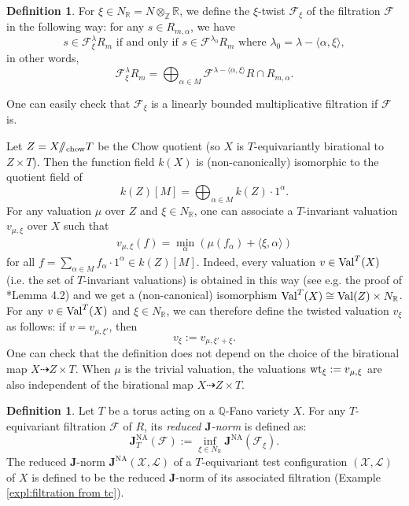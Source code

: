 \documentclass[12pt,reqno]{amsart}%
\newcommand{\bR}{{\mathbb{R} }}
\newcommand{\bZ}{{\mathbb{Z} }}
\newcommand{\cX}{{\mathcal{X}}}
\newcommand{\cL}{{\mathcal{L}}}
\newcommand{\cF}{\mathcal{F}}
\newcommand{\JNA}{\mathbf{J}^{\mathrm{NA}}}
\newcommand{\bfJ}{\mathbf{J} }
\theoremstyle{definition}
\newtheorem{defn}[thm]{Definition}
\theoremstyle{remark}
\newcommand{\Val}{{\rm Val}}
\newcommand{\ra}{{\rangle}}
\newcommand{\wt}{{\rm wt}}
\begin{document}
\begin{defn}\label{d-quotient}
For $\xi\in N_{\bR}=N\otimes_\bZ \bR$, we define the $\xi$-twist $\cF_{\xi}$ of the filtration $\cF$ in the following way: for any $s\in  R_{m,\alpha}$, we have
$$s\in \cF^\lambda_{\xi} R_m \mbox{ if and only if } s\in \cF^{\lambda_0} R_m \mbox{ where }\lambda_0=\lambda-\langle\alpha, \xi \ra,$$
in other words, 
 $$\cF^\lambda_{\xi} R_m = \bigoplus_{\alpha\in M}  \cF^{\lambda-\langle\alpha, \xi \ra}{R}\cap R_{m,\alpha}.$$
\end{defn}

One can easily check that $\cF_{\xi}$ is a linearly bounded multiplicative filtration if $\cF$ is. 

Let $Z=X  /\!\!/_{\rm chow}T$ be the Chow quotient (so $X$ is $T$-equivariantly birational to $Z\times T$). Then the function field $k(X)$ is (non-canonically) isomorphic to the quotient field of $$k(Z)[M]=\bigoplus_{\alpha\in M} k(Z)\cdot 1^\alpha.$$
For any valuation $\mu$ over $Z$ and $\xi\in N_\bR$, one can associate a $T$-invariant valuation $v_{\mu,\xi}$ over $X$ such that
\begin{eqnarray}\label{e-valuation}
v_{\mu,\xi}(f)=\min_{\alpha}(\mu(f_{\alpha})+\langle \xi, {\alpha}\ra)
\end{eqnarray}
for all $f=\sum_{\alpha\in M} f_{\alpha}\cdot 1^\alpha \in k(Z)[M]$. Indeed, every valuation $v\in \Val^T(X)$ (i.e. the set of $T$-invariant valuations) is obtained in this way (see e.g. the proof of \cite{BHJ17}*{Lemma 4.2}) and we get a (non-canonical) isomorphism $\Val^T(X)\cong \Val(Z)\times N_\bR$. For any $v\in\Val^T(X)$ and $\xi\in N_{\bR}$, we can therefore define the twisted valuation $v_{\xi}$ as follows: if $v=v_{\mu,\xi'}$, then
$$ v_{\xi}:=v_{\mu, \xi'+\xi}. $$
One can check that the definition does not depend on the choice of the birational map $X\dashrightarrow Z\times T$. When $\mu$ is the trivial valuation, the valuations $\wt_\xi:=v_{\mu,\xi}$ are also independent of the birational map $X\dashrightarrow Z\times T$.

\begin{defn}
Let $T$ be a torus acting on a $\mathbb{Q}$-Fano variety $X$. For any $T$-equivariant filtration $\cF$ of $R$, its {\it reduced $\bfJ$-norm} is defined as:
$$\JNA_T(\cF):=\inf_{\xi\in N_\bR}\JNA(\cF_{\xi}).$$
The reduced $\bfJ$-norm $\JNA(\cX,\cL)$ of a $T$-equivariant test configuration $(\cX,\cL)$ of $X$ is defined to be the reduced $\bfJ$-norm of its associated filtration (Example \ref{expl:filtration from tc}).
\end{defn}
\end{document}
